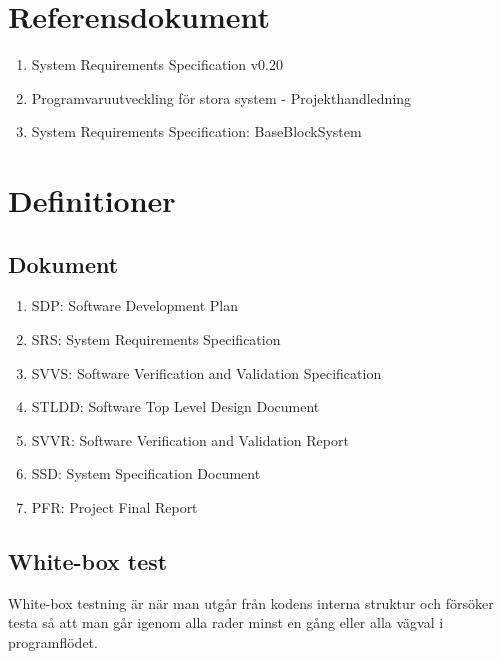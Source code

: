 \documentclass[a4paper]{article}
\begin{document}
\section{Referensdokument}
\begin{enumerate}
\item System Requirements Specification v0.20
\item Programvaruutveckling för stora system - Projekthandledning
\item System Requirements Specification: BaseBlockSystem
\end{enumerate}

\section{Definitioner}

\subsection{Dokument}

\begin{enumerate}

\item SDP: Software Development Plan

\item SRS: System Requirements Specification

\item SVVS: Software Verification and Validation Specification

\item STLDD: Software Top Level Design Document

\item SVVR: Software Verification and Validation Report

\item SSD: System Specification Document

\item PFR: Project Final Report


\end{enumerate}

\subsection{White-box test}

White-box testning är när man utgår från kodens interna struktur och försöker testa så att man går igenom alla rader minst en gång eller alla vägval i programflödet.
\end{document}
